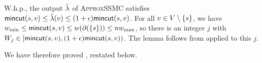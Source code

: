 \BL
W.h.p., the output $\tilde{\lambda}$ of \textsc{ApproxSSMC} satisfies $\textsf{\textup{mincut}}(s,v) \le \tilde{\lambda}(v) \le (1+\epsilon)\textsf{\textup{mincut}}(s,v)$.
\EL
\BP
For all $v\in V\setminus\{s\}$, we have $w_{\min}\le\textsf{\textup{mincut}}(s,v)\le w(\partial(\{s\}))\le nw_{\max}$, so there is an integer $j$ with $ W_j\in[\textsf{\textup{mincut}}(s,v),(1+\epsilon)\textsf{\textup{mincut}}(s,v))$. The lemma follows from  applied to this $j$.
\EP

We have therefore proved , restated below.
\SSMC*


